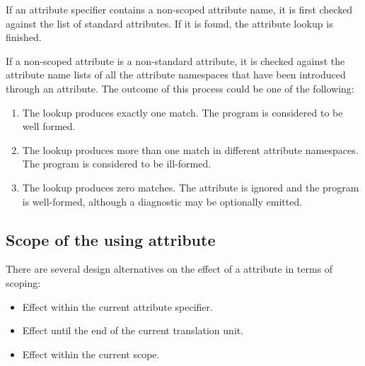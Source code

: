If an attribute specifier contains a non-scoped attribute name, it is
first checked against the list of standard attributes. If it is found,
the attribute lookup is finished.

If a non-scoped attribute is a non-standard attribute, it is checked
against the attribute name lists of all the attribute namespaces that have been
introduced through an  attribute. The outcome of this process
could be one of the following:

\begin{enumerate}

\item The lookup produces exactly one match. The program is considered
to be well formed.

\item The lookup produces more than one match in different attribute namespaces.
The program is considered to be ill-formed.

\item The lookup produces zero matches. The attribute is ignored and the
program is well-formed, although a diagnostic may be optionally emitted.

\end{enumerate}

\subsection{Scope of the using attribute}
\label{scoping}

There are several design alternatives on the effect of a 
attribute in terms of scoping:

\begin{itemize}

\item Effect within the current attribute specifier.
\item Effect until the end of the current translation unit.
\item Effect within the current scope.

\end{itemize}

